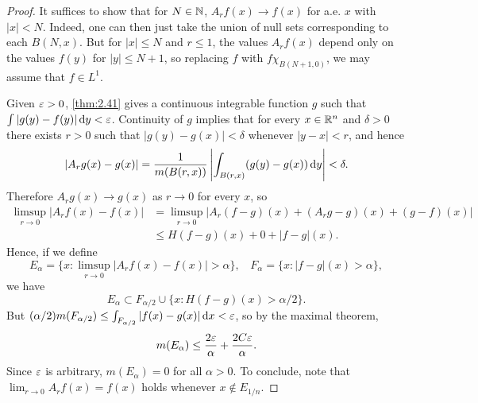\documentclass[12pt]{article} %
\begin{document}
\begin{proof}
    It suffices to show that for $N \in \mathbb{N}$, $A_r f(x) \to f(x)$ for a.e. $x$ with $|x| < N$. Indeed, one can then just take the union of null sets corresponding to each $B(N, x)$. But for $|x| \leq N$ and $r \leq 1$, the values $A_r f(x)$ depend only on the values $f(y)$ for $|y| \leq N+1$, so replacing $f$ with $f \chi_{B(N+1, 0)}$, we may assume that $f \in L^1$.

    Given $\varepsilon > 0$, \cref{thm:2.41} gives a continuous integrable function $g$ such that $\int|g(y) - f(y)|\, \mathrm{d} y < \varepsilon$. Continuity of $g$ implies that for every $x \in \mathbb{R}^n$ and $\delta > 0$ there exists $r > 0$ such that $|g(y) - g(x)| < \delta$ whenever $|y-x| < r$, and hence \[|A_r g(x) - g(x)| = \frac{1}{m(B(r, x))} \left|\int_{B(r, x)} (g(y) - g(x)) \, \mathrm{d} y \right| < \delta.\] Therefore $A_r g(x) \to g(x)$ as $r \to 0$ for every $x$, so \begin{align*}
        \limsup_{r \to 0} | A_r f(x) - f(x) | &= \limsup_{r \to 0} |A_r(f - g)(x) + (A_r g - g)(x) + (g-f)(x)|\\
        &\leq H(f-g)(x) + 0 + |f-g|(x).
    \end{align*}
    Hence, if we define \[E_\alpha = \{x : \limsup_{r \to 0} |A_r f(x) - f(x)| > \alpha\}, \ \ \ \ F_\alpha = \{x : |f-g|(x) > \alpha\},\] we have \[E_\alpha \subset F_{\alpha / 2} \cup \{x : H(f-g)(x) > \alpha / 2\}.\] But $(\alpha / 2)m(F_{\alpha / 2}) \leq \int_{F_{\alpha/2}} |f(x) - g(x)| \, \mathrm{d} x < \varepsilon$, so by the maximal theorem, \[m(E_\alpha) \leq \frac{2\varepsilon}{\alpha} + \frac{2C\varepsilon}{\alpha}.\] Since $\varepsilon$ is arbitrary, $m(E_\alpha) = 0$ for all $\alpha > 0$. To conclude, note that $\lim_{r \to 0} A_r f(x) = f(x)$ holds whenever $x \notin E_{1/n}$.
\end{proof}


\pagebreak

\small



\end{document}
